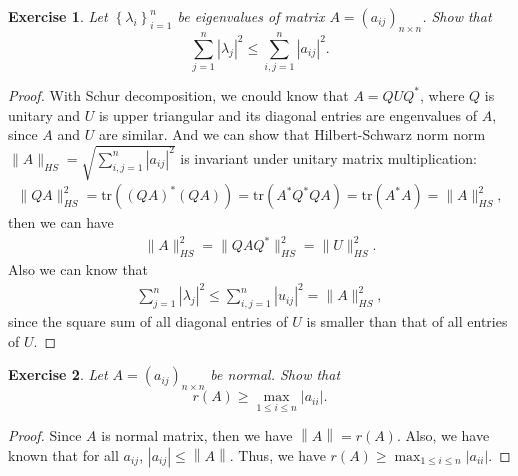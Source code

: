 \documentclass[11pt]{book}
\newtheorem{exercise}{Exercise}[section]
\theoremstyle{definition}
\numberwithin{equation}{chapter}
\begin{document}
\medskip

\begin{exercise}
Let $\left\{  \lambda_{i}\right\}  _{i=1}^{n}$ be eigenvalues of matrix
$A=\left(  a_{ij}\right)  _{n\times n}$. Show that%
$$
\sum_{j=1}^{n}\left\vert \lambda_{j}\right\vert ^{2}\leq\sum_{i,j=1}%
^{n}\left\vert a_{ij}\right\vert ^{2}.
$$
\end{exercise}
\begin{proof}
With Schur decomposition, we cnould know that $A = Q U Q^*$, where $Q$ is unitary and $U$ is upper triangular and its diagonal entries are engenvalues of $A$, since $A$ and $U$ are similar. And we can show that Hilbert-Schwarz norm norm $\|A\|_{HS} = \sqrt{\sum_{i,j=1}^{n} \left|a_{ij}\right|^2}$ is invariant under unitary matrix multiplication:
\begin{align*}
    \|QA\|_{HS}^2 = \text{tr} \left((QA)^* (QA)\right) = \text{tr} \left(A^* Q^* QA\right) = \text{tr} \left(A^* A\right) = \|A\|_{HS}^2,
\end{align*}
then we can have 
\begin{align*}
    \|A\|_{HS}^2 = \|QAQ^*\|_{HS}^2 = \|U\|_{HS}^2.
\end{align*}
Also we can know that
\begin{align*}
    \sum_{j=1}^{n}\left| \lambda_{j}\right|^{2}\leq \sum_{i,j=1}^{n}\left| u_{ij}\right|^{2} = \|A\|_{HS}^2,
\end{align*}
since the square sum of all diagonal entries of $U$ is smaller than that of all entries of $U$.
\end{proof}

\medskip

\begin{exercise}
Let $A=\left(  a_{ij}\right)  _{n\times n}$ be normal. Show that%
$$
r\left(  A\right)  \geq\max_{1\leq i\leq n}\left\vert a_{ii}\right\vert .
$$
\end{exercise}
\begin{proof}
Since $A$ is normal matrix, then we have $\left\|A\right\| = r(A)$. Also, we have known that for all $a_{ij}$, $\left|a_{ij}\right|\leq \left\|A\right\|$. Thus, we have $r(A)\geq \max_{1\leq i\leq n}\left|a_{ii}\right|$.
\end{proof}

\medskip
\end{document}
